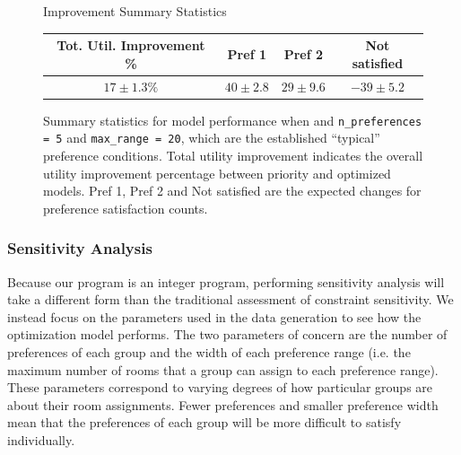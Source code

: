 \documentclass[12pt]{article}
\begin{document}
    \begin{figure}[h]
        \centering
        \captionsetup{width=.7\linewidth}
        Improvement Summary Statistics
        
        \begin{tabular}{cccc}
            Tot. Util. Improvement \% & Pref 1 & Pref 2 & Not satisfied\\
            \hline
            $17\pm1.3\%$ & $40\pm 2.8$ & $29\pm 9.6$ & $-39\pm5.2$
        \end{tabular}
        
        \caption{Summary statistics for model performance when and \texttt{n\_preferences = 5} and \texttt{max\_range = 20}, which are the established ``typical'' preference conditions. Total utility improvement indicates the overall utility improvement percentage between priority and optimized models. Pref 1, Pref 2 and Not satisfied are the expected changes for preference satisfaction counts.}
        \label{fig:summary_stats}
    \end{figure}

    \subsubsection*{Sensitivity Analysis}
    Because our program is an integer program, performing sensitivity analysis will take a different form than the traditional assessment of constraint sensitivity. We instead focus on the parameters used in the data generation to see how the optimization model performs. The two parameters of concern are the number of preferences of each group and the width of each preference range (i.e. the maximum number of rooms that a group can assign to each preference range). These parameters correspond to varying degrees of how particular groups are about their room assignments. Fewer preferences and smaller preference width mean that the preferences of each group will be more difficult to satisfy individually.
\end{document}
